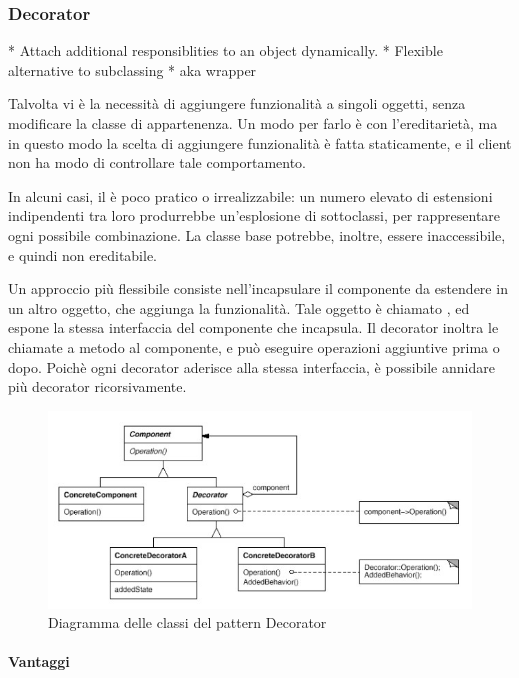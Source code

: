 \subsubsection{Decorator}

* Attach additional responsiblities to an object dynamically.
* Flexible alternative to subclassing
* aka wrapper

Talvolta vi è la necessità di aggiungere funzionalità a singoli oggetti, senza
modificare la classe di appartenenza. Un modo per farlo è con l'ereditarietà, ma
in questo modo la scelta di aggiungere funzionalità è fatta staticamente, e il
client non ha modo di controllare tale comportamento.

In alcuni casi, il  è poco pratico o irrealizzabile:
un numero elevato di estensioni indipendenti tra loro produrrebbe un'esplosione
di sottoclassi, per rappresentare ogni possibile combinazione. La classe base
potrebbe, inoltre, essere inaccessibile, e quindi non ereditabile.

Un approccio più flessibile consiste nell'incapsulare il componente da estendere
in un altro oggetto, che aggiunga la funzionalità. Tale oggetto è chiamato
, ed espone la stessa interfaccia del componente che
incapsula. Il decorator inoltra le chiamate a metodo al componente, e può
eseguire operazioni aggiuntive prima o dopo. Poichè ogni decorator aderisce alla
stessa interfaccia, è possibile annidare più decorator ricorsivamente.

\begin{figure}[h!]
  \centering
  \includegraphics[scale=0.55]{imgs/decorator.jpg}
  \caption{Diagramma delle classi del pattern Decorator}
\end{figure}

\paragraph{Vantaggi}

